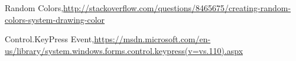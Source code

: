 \begin{thebibliography}{99999}
\singlespace\normalsize

 Random Colors,\url{http://stackoverflow.com/questions/8465675/creating-random-colors-system-drawing-color}

Control.KeyPress Event,\url{https://msdn.microsoft.com/en-us/library/system.windows.forms.control.keypress(v=vs.110).aspx}



\end{thebibliography}
